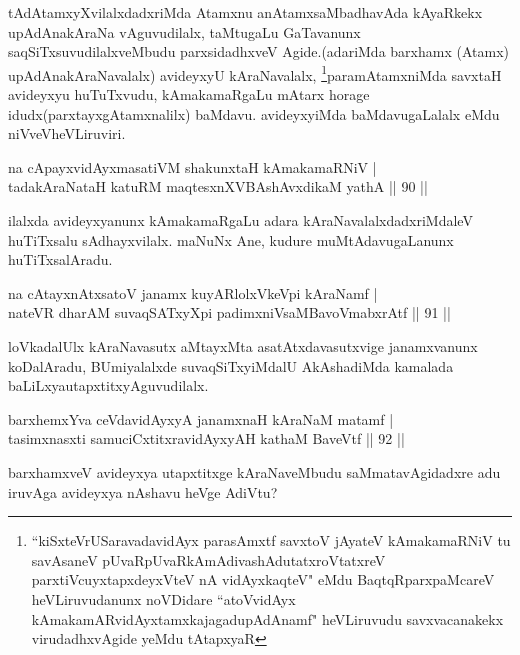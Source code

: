 \begin{artha}
tAdAtamxyXvilalxdadxriMda Atamxnu anAtamxsaMbadhavAda kAyaRkekx upAdAnakAraNa vAguvudilalx, taMtugaLu GaTavanunx saqSiTxsuvudilalxveMbudu parxsidadhxveV Agide.(adariMda barxhamx (Atamx) upAdAnakAraNavalalx) avideyxyU kAraNavalalx, \footnote{``kiSxteVrUSaravadavidAyx parasAmxtf savxtoV jAyateV kAmakamaRNiV tu savAsaneV pUvaRpUvaRkAmAdivashAdutatxroVtatxreV parxtiVcuyxtapxdeyxVteV nA vidAyxkaqteV" eMdu BaqtqRparxpaMcareV heVLiruvudanunx noVDidare ``atoVvidAyx kAmakamARvidAyxtamxkajagadupAdAnamf" heVLiruvudu savxvacanakekx virudadhxvAgide yeMdu tAtapxyaR}paramAtamxniMda savxtaH avideyxyu huTuTxvudu, kAmakamaRgaLu mAtarx horage idudx(parxtayxgAtamxnalilx) baMdavu. avideyxyiMda baMdavugaLalalx eMdu niVveV\break heVLiruviri.
\end{artha}


\begin{shl}
na cApayxvidAyxmasatiVM shakunxtaH kAmakamaRNiV |\\
tadakAraNataH katuRM maqtesxnXVBAshAvxdikaM yathA \hfill || 90 ||
\end{shl}

\begin{artha}
ilalxda avideyxyanunx kAmakamaRgaLu adara kAraNavalalxdadxriMdaleV huTiTxsalu 
sAdhayxvilalx. maNuNx Ane, kudure muMtAdavugaLanunx huTiTxsalAradu.
\end{artha}

\begin{shl}
na cAtayxnAtxsatoV janamx kuyARlolxVkeV\s pi kAraNamf |\\
nateVR dharAM suvaqSATxyX\s pi padimxniVsaMBavoV\s mabxrAtf \hfill || 91 ||
\end{shl}

\begin{artha}
loVkadalUlx kAraNavasutx aMtayxMta asatAtxdavasutxvige janamxvanunx koDalAradu, BUmiyalalxde suvaqSiTxyiMdalU AkAshadiMda kamalada baLiLxya\break utapxtitxyAguvudilalx.
\end{artha}

\begin{shl}
barxhemxYva ceVdavidAyxyA janamxnaH kAraNaM matamf |\\
tasimxnasxti samuciCxtitxravidAyxyAH kathaM BaveVtf \hfill || 92 ||
\end{shl}

\begin{artha}
barxhamxveV avideyxya  utapxtitxge kAraNaveMbudu saMmatavAgidadxre adu iruvAga avideyxya nAshavu heVge AdiVtu?
\end{artha}


